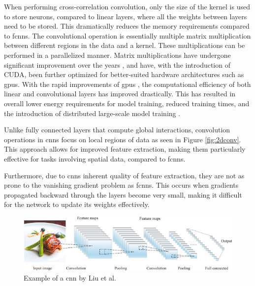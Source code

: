  When performing cross-correlation convolution, only the size of the kernel is used to store neurons, compared to linear layers, where all the weights between layers need to be stored. This dramatically reduces the memory requirements compared to \acrshort{fcnn}s. The convolutional operation is essentially multiple matrix multiplication between different regions in the data and a kernel. These multiplications can be performed in a parallelized manner. Matrix multiplications have undergone significant improvement over the years \cite{karstadt2020matrix}, and have, with the introduction of CUDA, been further optimized for better-suited hardware architectures such as \acrshort{gpu}s. With the rapid improvements of \acrshort{gpu}s \cite{bell2008efficient}, the computational efficiency of both linear and convolutional layers has improved drastically. This has resulted in overall lower energy requirements for model training, reduced training times, and the introduction of distributed large-scale model training \cite{mungoli2023scalable}. 

Unlike fully connected layers that compute global interactions, convolution operations in \acrshort{cnn}s focus on local regions of data as seen in Figure \ref{fig:2dconv}. This approach allows for improved feature extraction, making them particularly effective for tasks involving spatial data, compared to \acrshort{fcnn}s. 

Furthermore, due to \acrshort{cnn}s inherent quality of feature extraction, they are not as prone to the vanishing gradient problem \cite{tan2019vanishing} as \acrshort{fcnn}s. This occurs when gradients propagated backward through the layers become very small, making it difficult for the network to update its weights effectively. \\

\begin{figure}[!h]
    \centering
    \includegraphics[scale=0.8]{figures/conv2d.jpg}
    \caption{Example of a \acrshort{cnn} by Liu et al. \cite{LIU2021193}}
    \label{fig:cnn}
\end{figure}

